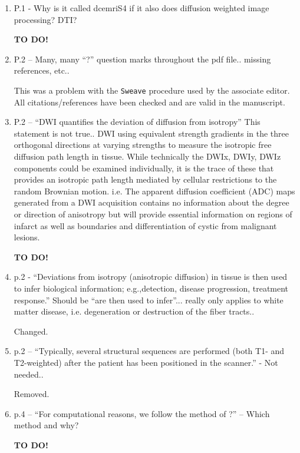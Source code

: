\documentclass[11pt]{article}
\begin{document}
\begin{enumerate}

\item P.1 - Why is it called dcemriS4 if it also does diffusion
  weighted image processing? DTI?

  \textbf{TO DO!}

\item P.2 – Many, many ``?'' question marks throughout the pdf
  file.. missing references, etc..

  This was a problem with the \texttt{Sweave} procedure used by the
  associate editor.  All citations/references have been checked and
  are valid in the manuscript.

\item P.2 – ``DWI quantifies the deviation of diffusion from
  isotropy'' This statement is not true..  DWI using equivalent
  strength gradients in the three orthogonal directions at varying
  strengths to measure the isotropic free diffusion path length in
  tissue. While technically the DWIx, DWIy, DWIz components could be
  examined individually, it is the trace of these that provides an
  isotropic path length mediated by cellular restrictions to the
  random Brownian motion.  i.e. The apparent diffusion coefficient
  (ADC) maps generated from a DWI acquisition contains no information
  about the degree or direction of anisotropy but will provide
  essential information on regions of infarct as well as boundaries
  and differentiation of cystic from malignant lesions.

  \textbf{TO DO!}

\item p.2 - ``Deviations from isotropy (anisotropic diffusion) in
  tissue is then used to infer biological information; e.g.,detection,
  disease progression, treatment response.''  Should be ``are then
  used to infer''... really only applies to white matter disease, i.e.
  degeneration or destruction of the fiber tracts..

  Changed.

\item p.2 – ``Typically, several structural sequences are performed
  (both T1- and T2-weighted) after the patient has been positioned in
  the scanner.'' - Not needed..

  Removed.

\item p.4 – ``For computational reasons, we follow the method of ?'' –
  Which method and why?

  \textbf{TO DO!}


\end{enumerate}
\end{document}
